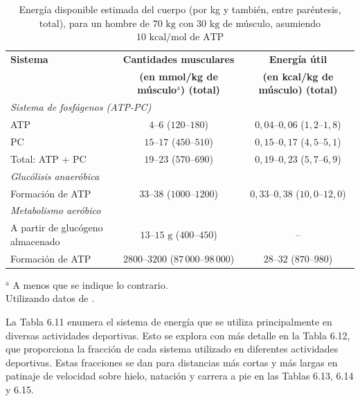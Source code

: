 \documentclass[12pt]{book}
\begin{document}
\begin{table}[htbp]
\centering
\caption{Energía disponible estimada del cuerpo (por kg y también, entre paréntesis, total), para un hombre de $70\text{ kg}$ con $30\text{ kg}$ de músculo, asumiendo $10\text{ kcal/mol de ATP}$}
\label{tab:69}
\small
\begin{tabularx}{\textwidth}{Xcc}
\toprule
\textbf{Sistema} & \textbf{Cantidades musculares} & \textbf{Energía útil} \\
 & \textbf{(en mmol/kg de músculo$^{\text{a}}$) (total)} & \textbf{(en kcal/kg de músculo) (total)} \\
\midrule
\multicolumn{3}{l}{\textit{Sistema de fosfágenos (ATP-PC)}} \\
\quad ATP & $4\text{--}6$ ($120\text{--}180$) & $0,04\text{--}0,06$ ($1,2\text{--}1,8$) \\
\quad PC & $15\text{--}17$ ($450\text{--}510$) & $0,15\text{--}0,17$ ($4,5\text{--}5,1$) \\
\quad Total: ATP + PC & $19\text{--}23$ ($570\text{--}690$) & $0,19\text{--}0,23$ ($5,7\text{--}6,9$) \\
\midrule
\multicolumn{3}{l}{\textit{Glucólisis anaeróbica}} \\
\quad Formación de ATP & $33\text{--}38$ ($1000\text{--}1200$) & $0,33\text{--}0,38$ ($10,0\text{--}12,0$) \\
\midrule
\multicolumn{3}{l}{\textit{Metabolismo aeróbico}} \\
\quad A partir de glucógeno almacenado & $13\text{--}15\text{ g}$ ($400\text{--}450$) & -- \\
\quad Formación de ATP & $2800\text{--}3200$ ($87\,000\text{--}98\,000$) & $28\text{--}32$ ($870\text{--}980$) \\
\bottomrule
\end{tabularx}
\begin{flushleft}
    $^{\text{a}}$ A menos que se indique lo contrario.\\
    Utilizando datos de \cite{35}.
\end{flushleft}
\end{table}

La Tabla 6.11 enumera el sistema de energía que se utiliza principalmente en diversas actividades deportivas. Esto se explora con más detalle en la Tabla 6.12, que proporciona la fracción de cada sistema utilizado en diferentes actividades deportivas. Estas fracciones se dan para distancias más cortas y más largas en patinaje de velocidad sobre hielo, natación y carrera a pie en las Tablas 6.13, 6.14 y 6.15.
\end{document}

